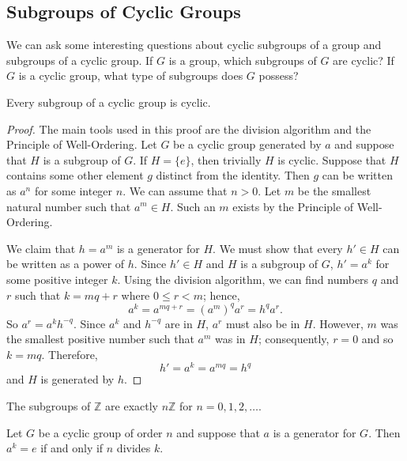  
 
\subsection*{Subgroups of Cyclic Groups}
 
 
We can ask some interesting questions about cyclic subgroups of a
group and subgroups of a cyclic group.  If $G$ is a group, which
subgroups of $G$ are cyclic? If $G$ is a cyclic group, what type of
subgroups does $G$ possess? 
 
 
 
\begin{theorem}
Every subgroup of a cyclic group is cyclic.
\end{theorem}
 
 
\begin{proof}
The main tools used in this proof are the division algorithm and the
Principle of Well-Ordering. Let $G$ be a cyclic group generated by $a$
and suppose that $H$ is a subgroup of $G$. If $H = \{ e \}$, then
trivially $H$ is cyclic. Suppose that $H$ contains some other element
$g$ distinct from the identity. Then $g$ can be written as
$a^n$ for some integer $n$. We can assume that $n > 0$. Let $m$ be the
smallest natural number such that $a^m \in H$. Such an $m$ exists by
the Principle of Well-Ordering.
 
 
We claim that $h = a^m$ is a generator for $H$.  We must show that
every $h' \in H$ can be written as a power of $h$. Since $h' \in H$
and $H$ is a subgroup of $G$, $h' = a^k$ for some positive integer
$k$. Using the division algorithm, we can find numbers $q$ and $r$
such that $k = mq +r$ where $0 \leq r < m$; hence,
\[
a^k = a^{mq +r} = (a^m)^q a^r = h^q a^r.
\]
So $a^r = a^k h^{-q}$. Since $a^k$ and $h^{-q}$ are in $H$, $a^r$ must
also be in $H$.  However, $m$ was the smallest positive number such that
$a^m$ was in $H$; consequently, $r=0$ and so $k=mq$. Therefore, 
\[
h' = a^k = a^{mq} =  h^q
\]
and $H$ is generated by $h$.
\end{proof}
 
 
\begin{corollary}
The subgroups of ${\mathbb Z}$ are exactly $n{\mathbb Z}$ for $n = 0, 1, 2,
\ldots$. 
\end{corollary}
 
 
\begin{proposition}\label{Cyclic_subgrp_order}
Let $G$ be a cyclic group of order $n$ and suppose that $a$ is a
generator for  $G$. Then $a^k=e$ if and only if $n$ divides $k$.
\end{proposition}
 
